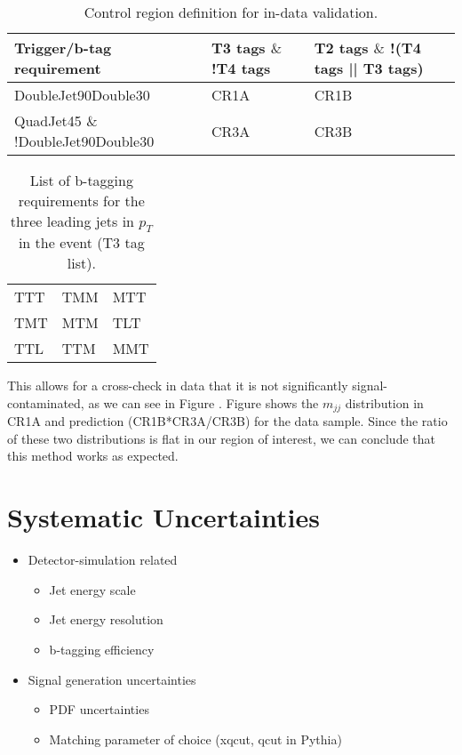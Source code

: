 \begin{table}[hbtp]\footnotesize
	\centering
	\begin{tabular}{l l l}
		\hline
		\textbf{Trigger/b-tag requirement} & T3 tags $\&$ !T4 tags & T2 tags $\&$ !(T4 tags || T3 tags) \\
		\hline
		DoubleJet90Double30 & CR1A & CR1B \\
		QuadJet45 $\&$!DoubleJet90Double30 & CR3A & CR3B \\
		\hline
	\end{tabular}
	\caption{Control region definition for in-data validation.}
	\label{tab:addtcr}
\end{table}

\begin{table}[hbtp]\footnotesize
	\centering
	\begin{tabular}{l|l|l}
		\hline
		TTT & TMM & MTT\\
		TMT & MTM & TLT\\
		TTL & TTM & MMT\\
		\hline
	\end{tabular}
	\caption{List of b-tagging requirements for the three leading jets in $p_{T}$ in the event (T3 tag list).}
	\label{tab:t3tag}
\end{table}

This allows for a cross-check in data that it is not significantly signal-contaminated, as we can see in Figure .
Figure shows the $m_{jj}$ distribution in CR1A and prediction (CR1B*CR3A/CR3B) for the data sample. Since the ratio of these two distributions is flat in our region of interest, we can conclude that this method works as expected.

\section{Systematic Uncertainties}
\begin{itemize}
	\item Detector-simulation related
	\begin{itemize}
		\item Jet energy scale
		\item Jet energy resolution
		\item b-tagging efficiency
	\end{itemize}
	\item Signal generation uncertainties
	\begin{itemize}
		\item PDF uncertainties
		\item Matching parameter of choice (xqcut, qcut in Pythia)
	\end{itemize}
\end{itemize}




